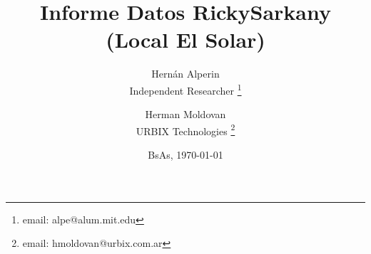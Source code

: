 \documentclass[12pt]{article}
\begin{document}
\title{Informe Datos RickySarkany (Local El Solar)}
\author{
Hernán Alperin\\
Independent Researcher
  \thanks{email: alpe@alum.mit.edu}
\and
Herman Moldovan\\
URBIX Technologies
  \thanks{email: hmoldovan@urbix.com.ar}
}
\date{BsAs, \today}
\maketitle



%

\end{document}
